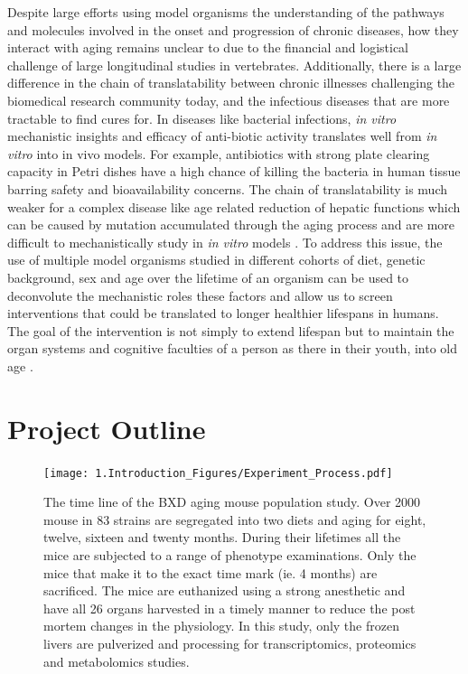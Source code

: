 \documentclass[a4paper,11pt,twoside]{book}
\begin{document}
	Despite large efforts using model organisms the understanding of the pathways and molecules involved in the onset and progression of chronic diseases, how they interact with aging remains unclear to due to the financial and logistical challenge of large longitudinal studies in vertebrates\citep{Williams2015TheAnalysis}. Additionally, there is a large difference in the chain of translatability between chronic illnesses challenging the biomedical research community today, and the infectious diseases that are more tractable to find cures for. In diseases like bacterial infections, \textit{in vitro} mechanistic insights and efficacy of anti-biotic activity translates well from \textit{in vitro} into in vivo models\citep{Moffat2017a}. For example, antibiotics with strong plate clearing capacity in Petri dishes have a high chance of killing the bacteria in human tissue barring safety and bioavailability concerns. The chain of translatability is much weaker for a complex disease like age related reduction of hepatic functions which can be caused by mutation accumulated through the aging process and are more difficult to mechanistically study in \textit{in vitro} models \citep{Moffat2017a}. To address this issue, the use of multiple model organisms studied in different cohorts of diet, genetic background, sex and age over the lifetime of an organism can be used to deconvolute the mechanistic roles these factors and allow us to screen interventions that could be translated to longer healthier lifespans in humans\cite{Armanios2015}. The goal of the intervention is not simply to extend lifespan but to maintain the organ systems and cognitive faculties of a person as there in their youth, into old age \cite{Armanios2015}.
	
	\section{Project Outline}
	
	\begin{figure}[htb!]
		\centering
		\texttt{[image: 1.Introduction\_Figures/Experiment\_Process.pdf]}
		\caption{The time line of the BXD aging mouse population study. Over 2000 mouse in 83 strains are segregated into two diets and aging for eight, twelve, sixteen and twenty months. During their lifetimes all the mice are subjected to a range of phenotype examinations. Only the mice that make it to the exact time mark (ie. 4 months) are sacrificed. The  mice are euthanized using a strong anesthetic and have all 26 organs harvested in a timely manner to reduce the post mortem changes in the physiology. In this study, only the frozen livers are pulverized and processing for transcriptomics, proteomics and metabolomics studies.}
		\label{fig: Outline of the BXD Aging Population Study}
	\end{figure}
	
\end{document}
